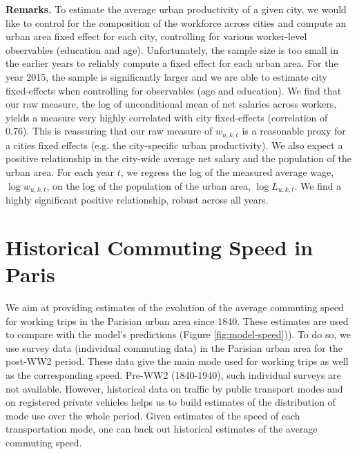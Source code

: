 \documentclass[11pt]{report}
\newcommand{\DADSpanel}{../../output/CASD/2022-07-08}
\begin{document}
\noindent \textbf{Remarks.} To estimate the average urban productivity of a given city, we would like to control for the composition of the workforce across cities and compute an urban area fixed effect for each city, controlling for various worker-level observables (education and age). Unfortunately, the sample size is too small in the earlier years to reliably compute a fixed effect for each urban area. For the year 2015, the sample is significantly larger and we are able to estimate city fixed-effects when controlling for observables (age and education). We find that our raw measure, the log of unconditional mean of net salaries across workers, yields a measure very highly correlated with city fixed-effects (correlation of 0.76). This is reassuring that our raw measure of $w_{u,k,t}$ is a reasonable proxy for a cities fixed effects (e.g. the city-specific urban productivity). We also expect a positive relationship in the city-wide average net salary and the population of the urban area. For each year $t$, we regress the log of the measured average wage, $\log w_{u,k,t}$, on the log of the population of the urban area, $\log L_{u,k,t}$. We find a highly significant positive relationship, robust across all years.





%



\newpage


\section{Historical Commuting Speed in Paris}\label{A-sec:commuteparis}

We aim at providing estimates of the evolution of the average commuting speed for working trips in the Parisian urban area since 1840. These estimates are used to compare with the model's predictions (Figure \ref{fig:model-speed})). To do so, we use survey data (individual commuting data) in the Parisian urban area for the post-WW2 period. These data give the main mode used for working trips as well as the corresponding speed. Pre-WW2 (1840-1940), such individual surveys are not available. However, historical data on traffic by public transport modes and on registered private vehicles helps us to build estimates of the distribution of mode use over the whole period. Given estimates of the speed of each transportation mode, one can back out historical estimates of the average commuting speed.
\end{document}
